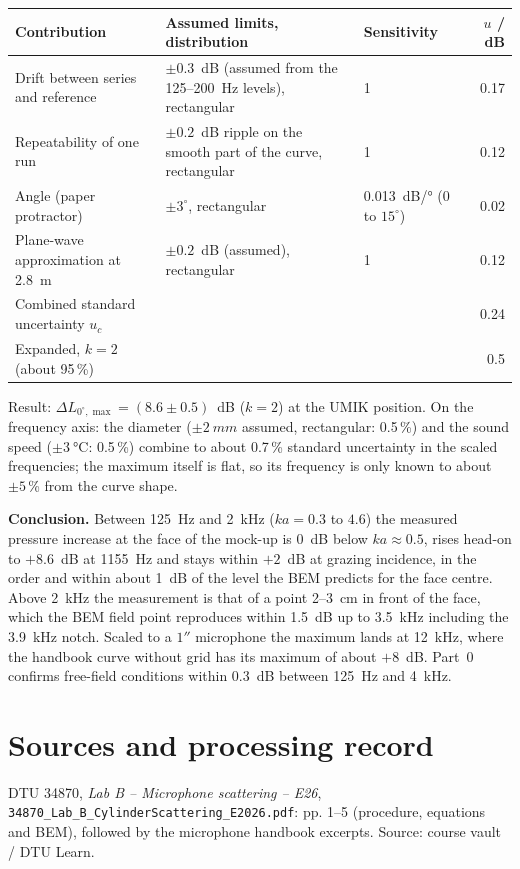 \documentclass[a4paper,10pt]{article}
\newcommand{\file}[1]{\nolinkurl{#1}}
\begin{document}
\begin{tabularx}{\linewidth}{@{}lXlr@{}}\toprule
Contribution & Assumed limits, distribution & Sensitivity & $u$ / dB \\\midrule
Drift between series and reference & $\pm0.3$~dB (assumed from the 125--\SI{200}{Hz} levels), rectangular & 1 & 0.17 \\
Repeatability of one run & $\pm0.2$~dB ripple on the smooth part of the curve, rectangular & 1 & 0.12 \\
Angle (paper protractor) & $\pm3^\circ$, rectangular & \SI{0.013}{dB/\degree} (0 to $15^\circ$) & 0.02 \\
Plane-wave approximation at \SI{2.8}{m} & $\pm0.2$~dB (assumed), rectangular & 1 & 0.12 \\\midrule
Combined standard uncertainty $u_c$ & & & 0.24 \\
Expanded, $k=2$ (about 95\,\%) & & & 0.5 \\\bottomrule
\end{tabularx}\par\smallskip
Result: $\Delta L_{0^\circ,\max}=(8.6\pm0.5)$~dB ($k=2$) at the UMIK position. On the
frequency axis: the diameter ($\pm\SI{2}{mm}$ assumed, rectangular: 0.5\,\%) and the sound
speed ($\pm\SI{3}{\celsius}$: 0.5\,\%) combine to about 0.7\,\% standard uncertainty in
the scaled frequencies; the maximum itself is flat, so its frequency is only known to
about $\pm5$\,\% from the curve shape.

\textbf{Conclusion.} Between \SI{125}{Hz} and \SI{2}{kHz} ($ka=0.3$ to $4.6$) the
measured pressure increase at the face of the mock-up is \SI{0}{dB} below $ka\approx0.5$,
rises head-on to $+8.6$~dB at \SI{1155}{Hz} and stays within $+2$~dB at grazing
incidence, in the order and within about \SI{1}{dB} of the level the BEM predicts for
the face centre. Above \SI{2}{kHz} the measurement is that of a point 2--\SI{3}{cm} in
front of the face, which the BEM field point reproduces within \SI{1.5}{dB} up to
\SI{3.5}{kHz} including the \SI{3.9}{kHz} notch. Scaled to a $1''$ microphone the
maximum lands at \SI{12}{kHz}, where the handbook curve without grid has its maximum of about $+8$~dB. Part~0
confirms free-field conditions within \SI{0.3}{dB} between \SI{125}{Hz} and \SI{4}{kHz}.

\section*{Sources and processing record}
\small
DTU 34870, \emph{Lab B -- Microphone scattering -- E26},
\file{34870_Lab_B_CylinderScattering_E2026.pdf}: pp. 1--5 (procedure, equations and
BEM), followed by the microphone handbook excerpts. Source: course vault / DTU Learn.
\end{document}

